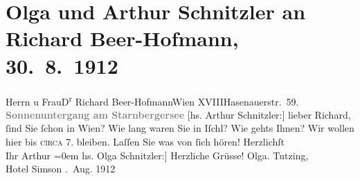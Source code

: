 

         
         \renewcommand{\erwaehntePersonen}{Personen: Richard Beer-Hofmann, Paula Beer-Hofmann}
         \renewcommand{\erwaehnteOrte}{Orte: Bad Ischl, Hasenauerstraße, Hotel Simson, Starnberger See, Tutzing, Wien, XVIII., Währing}
         \renewcommand{\erwaehnteWerke}{}
               \section[Olga und Arthur Schnitzler an Richard Beer-Hofmann, 30. 8. 1912]{ Olga und Arthur Schnitzler an Richard Beer-Hofmann, 30. 8. 1912}\nopagebreak{}\rehead{ }\begin{ledgroupsized}[t]{13cm}\normalsize\beginnumbering \toendnotes[C]{\smallbreak\pagebreak[2]} 
\pstart{}{\pb}Herrn u Frau\pend{}\pstart{}D\textsuperscript{r} Richard Beer-Hofmann\pend{}\pstart{}Wien XVIII\pend{}\pstart{}Hasenauerstr. 59.\pend{}{\bigskip}\pstart
           \noindent{}\centering{}{\pb}\textcolor{gray}{\textbf{Sonnenuntergang am Starnbergersee}}\pend
           \pstart
           {\pb}{[}hs. Arthur Schnitzler:{]} lieber Richard, ſind Sie ſchon in Wien? Wie lang waren Sie in Iſchl? Wie
               gehts Ihnen? Wir wollen hier bis \textsc{circa}{ }7. bleiben. Laſſen Sie  was von ſich
               hören!\pend
           \pstart
           Herzlichſt{\\[\baselineskip]}Ihr \spacefill\mbox{Arthur}\pend
           \leftskip=0em{}\pstart
           \noindent{}{[}hs. Olga Schnitzler:{]} Herzliche Grüsse!\pend
           \pstart \spacefill\mbox{Olga.}\pend{}\pstart
           \noindent{}Tutzing,{\\}Hotel Simson\pend
           . Aug. 1912\pend
           
         
         \endnumbering{}\end{ledgroupsized}  \newcommand{\dateiname}{L02087}\newcommand{\titel}{Olga und Arthur Schnitzler an Richard Beer-Hofmann, 30. 8. 1912}\newcommand{\editorInnen}{Martin Anton Müller und Gerd-Hermann Susen}
      